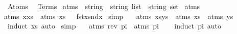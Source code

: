 %
\begin{isabellebody}%
%
%
\isadelimtheory
\isanewline
%
\endisadelimtheory
%
\isatagtheory
{}\isamarkupfalse%
\ Atoms\ \isanewline
\isanewline
{}\ Terms\isanewline
\isanewline
{}%
\endisatagtheory
{\isafoldtheory}%
%
\isadelimtheory
\isanewline
%
\endisadelimtheory
\isanewline
{}\isamarkupfalse%
\ atms\ {\isacharcolon}{\kern0pt}{\isacharcolon}{\kern0pt}\ {\isachardoublequoteopen}{\isacharparenleft}{\kern0pt}string\ {\isasymtimes}\ string{\isacharparenright}{\kern0pt}\ list\ {\isasymRightarrow}\ string\ set{\isachardoublequoteclose}\ \isanewline
{\isachardoublequoteopen}atms\ {\isacharbrackleft}{\kern0pt}{\isacharbrackright}{\kern0pt}\ {\isacharequal}{\kern0pt}\ {\isacharbraceleft}{\kern0pt}{\isacharbraceright}{\kern0pt}{\isachardoublequoteclose}\ {\isacharbar}{\kern0pt}\ \isanewline
{\isachardoublequoteopen}atms\ {\isacharparenleft}{\kern0pt}x{\isacharhash}{\kern0pt}xs{\isacharparenright}{\kern0pt}\ {\isacharequal}{\kern0pt}\ {\isacharparenleft}{\kern0pt}{\isacharparenleft}{\kern0pt}atms\ xs{\isacharparenright}{\kern0pt}\ {\isasymunion}\ \ {\isacharbraceleft}{\kern0pt}fst{\isacharparenleft}{\kern0pt}x{\isacharparenright}{\kern0pt}{\isacharcomma}{\kern0pt}snd{\isacharparenleft}{\kern0pt}x{\isacharparenright}{\kern0pt}{\isacharbraceright}{\kern0pt}{\isacharparenright}{\kern0pt}{\isachardoublequoteclose}\isanewline
\isanewline
\isanewline
{}\isamarkupfalse%
\ {\isacharbrackleft}{\kern0pt}simp{\isacharbrackright}{\kern0pt}{\isacharcolon}{\kern0pt}\ \isanewline
\ \ {\isachardoublequoteopen}atms\ {\isacharparenleft}{\kern0pt}xs{\isacharat}{\kern0pt}ys{\isacharparenright}{\kern0pt}\ {\isacharequal}{\kern0pt}\ atms\ xs\ {\isasymunion}\ atms\ ys{\isachardoublequoteclose}\isanewline
%
\isadelimproof
\ \ %
\endisadelimproof
%
\isatagproof
{}\isamarkupfalse%
\ {\isacharparenleft}{\kern0pt}induct\ xs{\isacharparenright}{\kern0pt}\ auto%
\endisatagproof
{\isafoldproof}%
%
\isadelimproof
\isanewline
%
\endisadelimproof
\isanewline
\isanewline
{}\isamarkupfalse%
\ {\isacharbrackleft}{\kern0pt}simp{\isacharbrackright}{\kern0pt}{\isacharcolon}{\kern0pt}\ \isanewline
\ \ {\isachardoublequoteopen}atms\ {\isacharparenleft}{\kern0pt}rev\ pi{\isacharparenright}{\kern0pt}\ {\isacharequal}{\kern0pt}\ atms\ pi{\isachardoublequoteclose}\isanewline
%
\isadelimproof
\ \ %
\endisadelimproof
%
\isatagproof
{}\isamarkupfalse%
\ {\isacharparenleft}{\kern0pt}induct\ pi{\isacharparenright}{\kern0pt}\ auto%

\end{isabellebody}

